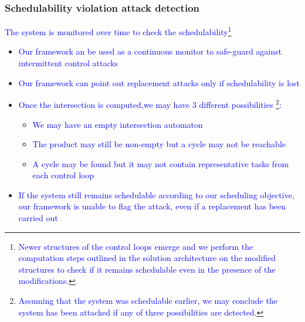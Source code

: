 \begin{frame}
\frametitle{Schedulability violation attack detection}

\tiny{\textcolor{blue}{ The system is monitored over time to check the schedulability\footnote{\tiny{\textcolor{blue}{Newer structures of the control loops
emerge and we perform the  computation steps outlined in the solution architecture on the
modified structures to check if it remains schedulable even in the presence of the
modifications.}}}}}\\
\begin{itemize}
\item \tiny{\textcolor{blue}{Our framework an be used as a continuous monitor to
safe-guard against intermittent control attacks}}\\

\item \tiny{\textcolor{blue}{Our framework  can point out replacement
attacks only if schedulability is lost}}\\

\item \tiny{\textcolor{blue}{Once the intersection is computed,we may have 3 different possibilities
\footnote{\tiny{\textcolor{blue}{Assuming that the system was schedulable earlier, we may conclude the system has 
been attacked if any of three possibilities are detected.}}}:}}\\

  \begin{itemize}
	\item \tiny{\textcolor{blue}{We may have an empty intersection automaton}}
	\item \tiny{\textcolor{blue}{The product may still be non-empty but a cycle may not be reachable}}
	\item \tiny{\textcolor{blue}{A cycle may be found but it may not contain representative tasks from each control loop}}

  \end{itemize}

\item \tiny{\textcolor{blue}{If the system still remains schedulable according to our scheduling objective, our framework is unable to
                            flag the attack, even if a replacement has been carried out}}
\end{itemize}

\end{frame}

